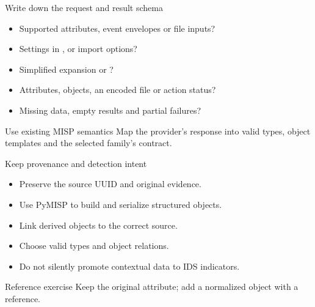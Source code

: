 \begin{frame}{Write down the request and result schema}
    \begin{itemize}
        \item Supported attributes, event envelopes or file inputs?
        \item Settings in ,  or import options?
        \item Simplified expansion or ?
        \item Attributes, objects, an encoded file or action status?
        \item Missing data, empty results and partial failures?
    \end{itemize}
    \begin{block}{Use existing MISP semantics}
        Map the provider's response into valid types, object templates
        and the selected family's contract.
    \end{block}
\end{frame}

\begin{frame}{Keep provenance and detection intent}
    \begin{itemize}
        \item Preserve the source UUID and original evidence.
        \item Use PyMISP to build and serialize structured objects.
        \item Link derived objects to the correct source.
        \item Choose valid types and object relations.
        \item Do not silently promote contextual data to IDS indicators.
    \end{itemize}
    \begin{block}{Reference exercise}
        Keep the original attribute; add a normalized 
        object with a  reference.
    \end{block}
\end{frame}

